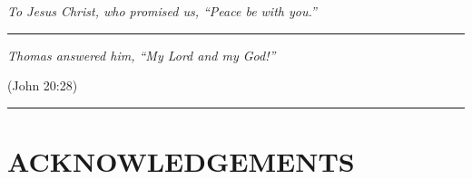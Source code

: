 \documentclass[
  12pt,
]{article}
\begin{document}
\begin{center}
\vspace*{\fill}

\large \textit{To Jesus Christ, who promised us, “Peace be with you.”}

\vspace{1em}

\rule{0.6\linewidth}{0.5pt}

\vspace{1em}

\Large\textit{Thomas answered him, “My Lord and my God!”}  

\medskip  

\large\textup{(John 20:28)}

\vspace{1em}

\rule{0.6\linewidth}{0.5pt}

\vspace*{\fill}
\end{center}

\newpage

\section*{ACKNOWLEDGEMENTS}\label{acknowledgements}

\thispagestyle{plain}
\end{document}
